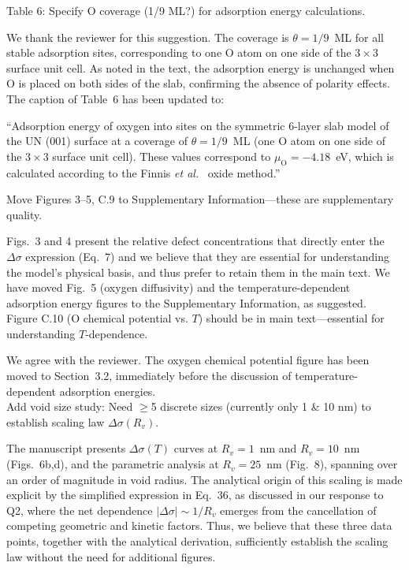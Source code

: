 \documentclass[12pt]{article}
\begin{document}
\color{blue}
Table 6: Specify O coverage (1/9 ML?) for adsorption energy calculations.\\
\color{black}

We thank the reviewer for this suggestion. The coverage is $\theta = 1/9$~ML for all stable adsorption sites, corresponding to one O atom on one side of the $3 \times 3$ surface unit cell. As noted in the text, the adsorption energy is unchanged when O is placed on both sides of the slab, confirming the absence of polarity effects. The caption of Table~6 has been updated to:

\color{red} ``Adsorption energy of oxygen into sites on the symmetric 6-layer slab model of the UN (001) surface at a coverage of $\theta = 1/9$~ML (one O atom on one side of the $3 \times 3$ surface unit cell). These values correspond to $\mu_\text{O} = -4.18$~eV, which is calculated according to the Finnis \textit{et al.}~\cite{Finnis2005} oxide method.''\\
\color{black}

\color{blue}
Move Figures 3--5, C.9 to Supplementary Information---these are supplementary quality.\\
\color{black}

Figs.~3 and 4 present the relative defect concentrations that directly enter the $\Delta \sigma$ expression (Eq.~7) and we believe that they are essential for understanding the model's physical basis, and thus prefer to retain them in the main text. We have moved Fig.~5 (oxygen diffusivity) and the temperature-dependent adsorption energy figures to the Supplementary Information, as suggested.\\

\color{blue}
Figure C.10 (O chemical potential vs. $T$) should be in main text---essential for understanding $T$-dependence.\\
\color{black}

We agree with the reviewer. The oxygen chemical potential figure has been moved to Section~3.2, immediately before the discussion of temperature-dependent adsorption energies.\\

\color{blue}
Add void size study: Need $\geq$5 discrete sizes (currently only 1 \& 10 nm) to establish scaling law $\Delta \sigma(R_v)$.\\
\color{black}

The manuscript presents $\Delta \sigma(T)$ curves at $R_v = 1$~nm and $R_v = 10$~nm (Figs.~6b,d), and the parametric analysis at $R_v = 25$~nm (Fig.~8), spanning over an order of magnitude in void radius. The analytical origin of this scaling is made explicit by the simplified expression in Eq.~36, as discussed in our response to Q2, where the net dependence $|\Delta \sigma| \sim 1/R_v$ emerges from the cancellation of competing geometric and kinetic factors. Thus, we believe that these three data points, together with the analytical derivation, sufficiently establish the scaling law without the need for additional figures.\\
\end{document}
